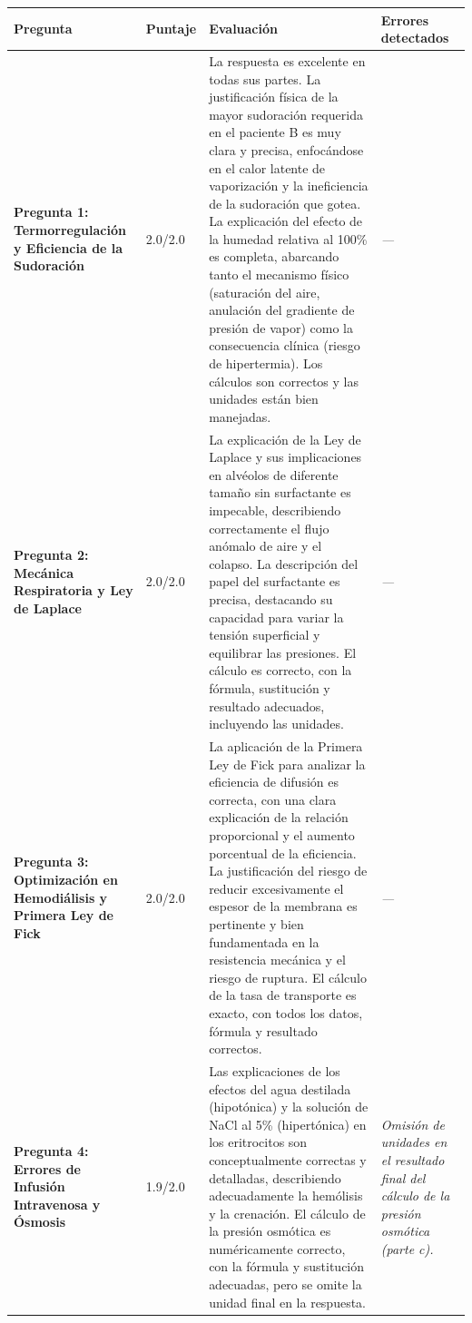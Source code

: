 \documentclass[11pt,a4paper]{article}
\begin{document}
\begin{longtable}{>{\bfseries}p{2.8cm} p{1.6cm} p{7.0cm} p{2.8cm}}
  \toprule
  \textbf{Pregunta} & \textbf{Puntaje} & \textbf{Evaluación} & \textbf{Errores detectados} \\
  \midrule
  \endhead
  \bottomrule
  \endfoot
    \textbf{Pregunta 1: Termorregulación y Eficiencia de la Sudoración} & 2.0/2.0 & La respuesta es excelente en todas sus partes. La justificación física de la mayor sudoración requerida en el paciente B es muy clara y precisa, enfocándose en el calor latente de vaporización y la ineficiencia de la sudoración que gotea. La explicación del efecto de la humedad relativa al 100\% es completa, abarcando tanto el mecanismo físico (saturación del aire, anulación del gradiente de presión de vapor) como la consecuencia clínica (riesgo de hipertermia). Los cálculos son correctos y las unidades están bien manejadas. & \textit{---} \\
    \midrule
    \textbf{Pregunta 2: Mecánica Respiratoria y Ley de Laplace} & 2.0/2.0 & La explicación de la Ley de Laplace y sus implicaciones en alvéolos de diferente tamaño sin surfactante es impecable, describiendo correctamente el flujo anómalo de aire y el colapso. La descripción del papel del surfactante es precisa, destacando su capacidad para variar la tensión superficial y equilibrar las presiones. El cálculo es correcto, con la fórmula, sustitución y resultado adecuados, incluyendo las unidades. & \textit{---} \\
    \midrule
    \textbf{Pregunta 3: Optimización en Hemodiálisis y Primera Ley de Fick} & 2.0/2.0 & La aplicación de la Primera Ley de Fick para analizar la eficiencia de difusión es correcta, con una clara explicación de la relación proporcional y el aumento porcentual de la eficiencia. La justificación del riesgo de reducir excesivamente el espesor de la membrana es pertinente y bien fundamentada en la resistencia mecánica y el riesgo de ruptura. El cálculo de la tasa de transporte es exacto, con todos los datos, fórmula y resultado correctos. & \textit{---} \\
    \midrule
    \textbf{Pregunta 4: Errores de Infusión Intravenosa y Ósmosis} & 1.9/2.0 & Las explicaciones de los efectos del agua destilada (hipotónica) y la solución de NaCl al 5\% (hipertónica) en los eritrocitos son conceptualmente correctas y detalladas, describiendo adecuadamente la hemólisis y la crenación. El cálculo de la presión osmótica es numéricamente correcto, con la fórmula y sustitución adecuadas, pero se omite la unidad final en la respuesta. & \textit{Omisión de unidades en el resultado final del cálculo de la presión osmótica (parte c).} \\

\end{longtable}
\end{document}
